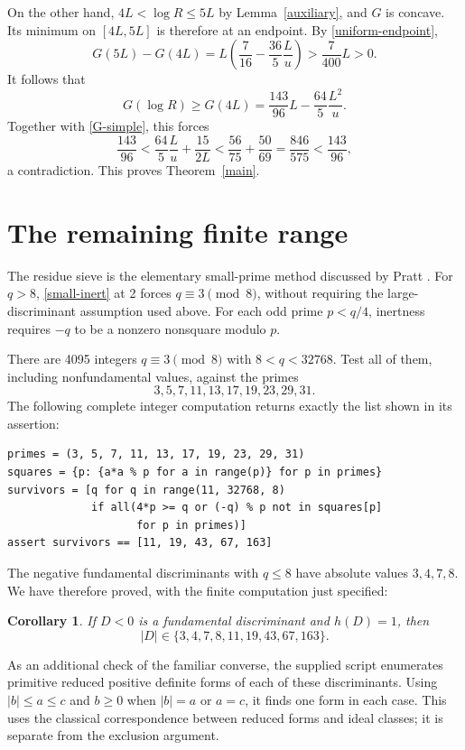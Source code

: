 \documentclass[11pt]{article}
\newtheorem{corollary}[theorem]{Corollary}
\begin{document}
On the other hand, \(4L<\log R\le5L\) by
Lemma~\ref{auxiliary}, and \(G\) is concave. Its minimum on
\([4L,5L]\) is therefore at an endpoint. By
\eqref{uniform-endpoint},
\[
 G(5L)-G(4L)
 =L\left(\frac7{16}-\frac{36}{5}\frac Lu\right)
 >\frac7{400}L>0.
\]
It follows that
\[
 G(\log R)\ge G(4L)
 =\frac{143}{96}L-\frac{64}{5}\frac{L^2}{u}.
\]
Together with \eqref{G-simple}, this forces
\[
 \frac{143}{96}
 <\frac{64}{5}\frac Lu+\frac{15}{2L}
 <\frac{56}{75}+\frac{50}{69}
 =\frac{846}{575}<\frac{143}{96},
\]
a contradiction. This proves Theorem~\ref{main}.

\section{The remaining finite range}\label{finite}

The residue sieve is the elementary small-prime method discussed by
Pratt \cite{prattsieve}. For \(q>8\), \eqref{small-inert} at 2
forces \(q\equiv3\pmod8\), without requiring the large-discriminant
assumption used above. For each odd prime \(p<q/4\), inertness
requires \(-q\) to be a nonzero nonsquare modulo \(p\).

There are 4095 integers \(q\equiv3\pmod8\) with
\(8<q<32768\). Test all of them, including nonfundamental values,
against the primes
\[
 3,5,7,11,13,17,19,23,29,31.
\]
The following complete integer computation returns exactly the list
shown in its assertion:
\begin{verbatim}
primes = (3, 5, 7, 11, 13, 17, 19, 23, 29, 31)
squares = {p: {a*a % p for a in range(p)} for p in primes}
survivors = [q for q in range(11, 32768, 8)
             if all(4*p >= q or (-q) % p not in squares[p]
                    for p in primes)]
assert survivors == [11, 19, 43, 67, 163]
\end{verbatim}
The negative fundamental discriminants with \(q\le8\) have
absolute values \(3,4,7,8\). We have therefore proved, with the
finite computation just specified:
\begin{corollary}
If \(D<0\) is a fundamental discriminant and \(h(D)=1\), then
\[
 |D|\in\{3,4,7,8,11,19,43,67,163\}.
\]
\end{corollary}
As an additional check of the familiar converse, the supplied script
enumerates primitive reduced positive definite forms of each of these
discriminants. Using \(|b|\le a\le c\) and \(b\ge0\) when
\(|b|=a\) or \(a=c\), it finds one form in each case. This uses the
classical correspondence between reduced forms and ideal classes;
it is separate from the exclusion argument.
\end{document}
